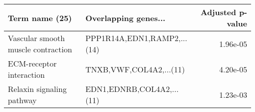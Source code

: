 \begin{tabular}{llr}
\toprule
                    Term name (25) &        Overlapping genes... &  Adjusted p-value \\
\midrule
Vascular smooth muscle contraction & PPP1R14A,EDN1,RAMP2,...(14) &          1.96e-05 \\
          ECM-receptor interaction &     TNXB,VWF,COL4A2,...(11) &          4.20e-05 \\
         Relaxin signaling pathway &   EDN1,EDNRB,COL4A2,...(11) &          1.23e-03 \\
\bottomrule
\end{tabular}
